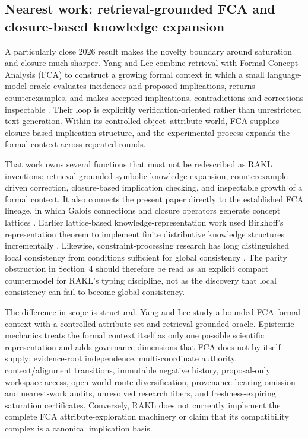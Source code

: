 \subsection{Nearest work: retrieval-grounded FCA and closure-based knowledge expansion}

A particularly close 2026 result makes the novelty boundary around saturation and closure much sharper. Yang and Lee combine retrieval with Formal Concept Analysis (FCA) to construct a growing formal context in which a small language-model oracle evaluates incidences and proposed implications, returns counterexamples, and makes accepted implications, contradictions and corrections inspectable \cite{yanglee2026fca}. Their loop is explicitly verification-oriented rather than unrestricted text generation. Within its controlled object--attribute world, FCA supplies closure-based implication structure, and the experimental process expands the formal context across repeated rounds.

That work owns several functions that must not be redescribed as RAKL inventions: retrieval-grounded symbolic knowledge expansion, counterexample-driven correction, closure-based implication checking, and inspectable growth of a formal context. It also connects the present paper directly to the established FCA lineage, in which Galois connections and closure operators generate concept lattices \cite{ganter1999}. Earlier lattice-based knowledge-representation work used Birkhoff's representation theorem to implement finite distributive knowledge structures incrementally \cite{oles2000}. Likewise, constraint-processing research has long distinguished local consistency from conditions sufficient for global consistency \cite{dechter1992}. The parity obstruction in Section~4 should therefore be read as an explicit compact countermodel for RAKL's typing discipline, not as the discovery that local consistency can fail to become global consistency.

The difference in scope is structural. Yang and Lee study a bounded FCA formal context with a controlled attribute set and retrieval-grounded oracle. Epistemic mechanics treats the formal context itself as only one possible scientific representation and adds governance dimensions that FCA does not by itself supply: evidence-root independence, multi-coordinate authority, context/alignment transitions, immutable negative history, proposal-only workspace access, open-world route diversification, provenance-bearing omission and nearest-work audits, unresolved research fibers, and freshness-expiring saturation certificates. Conversely, RAKL does not currently implement the complete FCA attribute-exploration machinery or claim that its compatibility complex is a canonical implication basis.

